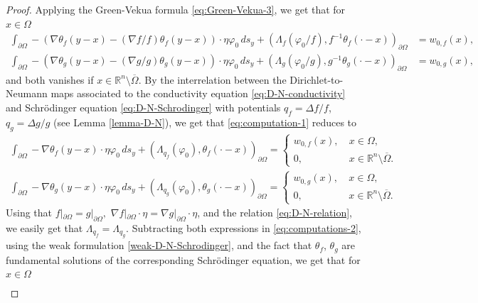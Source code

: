 \documentclass[12pt]{article}
\def\R{\mathbb{R}}
\begin{document}
\begin{proof}
Applying the Green-Vekua formula \eqref{eq:Green-Vekua-3}, we get that for $x\in \Omega$
\begin{align}\label{eq:computation-1}
\int_{\partial\Omega} -\left(\nabla \theta_f(y-x)-(\nabla f/f)\theta_f(y-x)\right)\cdot \eta \varphi_0 \, ds_y+\left(\Lambda_f(\varphi_0/f), f^{-1}\theta_f(\cdot-x)\right)_{\partial\Omega}&=w_{0,f}(x),\nonumber \\
\int_{\partial\Omega} -\left(\nabla \theta_g(y-x)-(\nabla g/g)\theta_g(y-x)\right)\cdot \eta \varphi_0 \, ds_y+\left(\Lambda_g(\varphi_0/g), g^{-1}\theta_g(\cdot-x)\right)_{\partial\Omega}&=w_{0,g}(x),
\end{align}
and both vanishes if $x\in \mathbb{R}^n\setminus \overline{\Omega}$. By the interrelation between the Dirichlet-to-Neumann maps associated to the conductivity equation \eqref{eq:D-N-conductivity} and Schr\"{o}dinger equation \eqref{eq:D-N-Schrodinger} with potentials $q_f=\Delta f/f$, $q_g=\Delta g/g$ (see Lemma \ref{lemma-D-N}), we get that \eqref{eq:computation-1} reduces to
\begin{align}\label{eq:computations-2}
\int_{\partial\Omega} -\nabla \theta_f(y-x)\cdot \eta \varphi_0 \, ds_y+\left(\Lambda_{q_f}(\varphi_0), \theta_f(\cdot-x)\right)_{\partial\Omega} =\left\{
   \begin{array}{ll}
      w_{0,f}(x), \ & x\in \Omega,\\
      0,           & x\in \R^n\setminus \overline{\Omega}.
   \end{array}
\right.\nonumber \\
\int_{\partial\Omega} -\nabla \theta_g(y-x)\cdot \eta \varphi_0 \, ds_y+ \left(\Lambda_{q_g}(\varphi_0), \theta_g(\cdot-x)\right)_{\partial\Omega} =\left\{
   \begin{array}{ll}
      w_{0,g}(x), \ & x\in \Omega,\\
      0,           & x\in \R^n\setminus \overline{\Omega}.
   \end{array}
\right.
\end{align}
Using that $f|_{\partial\Omega}=g|_{\partial\Omega},$ $\nabla f|_{\partial\Omega}\cdot \eta=\nabla g|_{\partial\Omega}\cdot \eta$, and the relation \eqref{eq:D-N-relation}, we easily get that  $\Lambda_{q_f}=\Lambda_{q_g}$. Subtracting both expressions in \eqref{eq:computations-2}, using the weak formulation \eqref{weak-D-N-Schrodinger}, and the fact that $\theta_f$, $\theta_g$ are fundamental solutions of the corresponding Schr\"{o}dinger equation, we get that for $x\in \Omega$
\begin{align}\label{eq:equivalences}

\end{align}
\end{proof}
\end{document}
